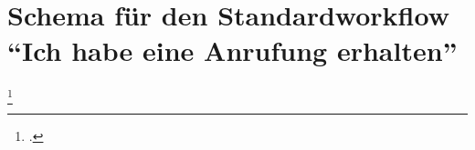 
\chapter{Schema für den Standardworkflow \enquote{Ich habe eine Anrufung erhalten}}
\blindtext[1]
\blindtext[1]\footcites{BSG1715HS}{BSG1615HS}{LSGBB147}{Rossner2014}
\blindtext[1]

\chapterbib
